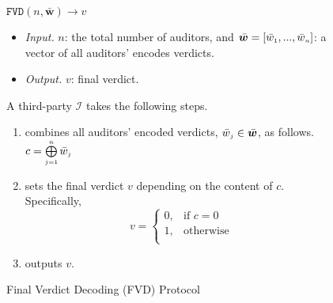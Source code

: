  \vspace{-2mm}
\begin{figure}[!htbp]
\setlength{\fboxsep}{1pt}
\begin{center}
    \begin{tcolorbox}[enhanced,width=5.5in, height=41.5mm,
    drop fuzzy shadow southwest,
    colframe=black,colback=white]
    \small{
    \vspace{-1.3mm}
\underline{$\mathtt{FVD}(n,  \bar{\bm w})\rightarrow  v$}\\
%
\vspace{-2.1mm}
\begin{itemize}
\item \noindent\textit{Input.} $n$:  the total number of  auditors,  and  $\bar{\bm w}=[\bar{ w}_{\scriptscriptstyle 1},..., \bar{ w}_{\scriptscriptstyle n}]$:  a vector of all auditors' encodes  verdicts.
%
\item \noindent\textit{Output.} $v$: final verdict.  
%
\end{itemize}
A third-party $\mathcal{I}$ takes the following steps.
    \vspace{-1.3mm}
\begin{enumerate}
%
\item combines  all auditors' encoded verdicts, $\bar w_{\scriptscriptstyle j}\in \bar{\bm {w}}$, as follows. 
%
$c= \bigoplus\limits^{\scriptscriptstyle n}_{\scriptscriptstyle j=1} \bar w_{\scriptscriptstyle j}$
%
\item sets the final verdict $v$ depending on the content of $c$. Specifically, 
%
\vspace{-1mm}
\begin{equation*}
   v= 
\begin{cases}
    0,              &\text{if } c= 0\\
   1 ,& \text{otherwise }\\
\end{cases}
\end{equation*}
%
\item outputs  $v$. 
\vspace{-1.5mm}
 \end{enumerate}
}
\end{tcolorbox}
\end{center}
\vspace{-2mm}
\caption{Final Verdict Decoding  (FVD) Protocol} 
\label{fig:FVD}
\end{figure}


